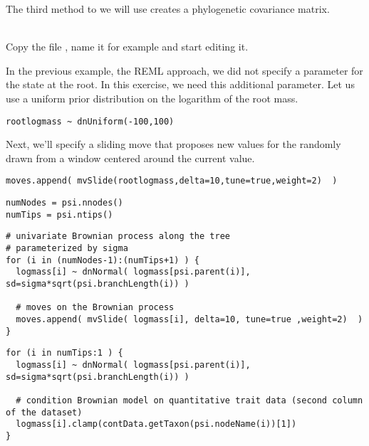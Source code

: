 The third method to we will use creates a phylogenetic covariance matrix. 

\noindent \\ \impmark Copy the file , name it for example  and start editing it.

In the previous example, the REML approach, we did not specify a parameter for the state at the root.
In this exercise, we need this additional parameter.
Let us use a uniform prior distribution on the logarithm of the root mass.
{\tt \small \begin{snugshade*}
\begin{lstlisting}
rootlogmass ~ dnUniform(-100,100)
\end{lstlisting}
\end{snugshade*}}
Next, we'll specify a sliding move that proposes new values for the  randomly drawn from a window centered around the current value.
{\tt \small \begin{snugshade*}
\begin{lstlisting}
moves.append( mvSlide(rootlogmass,delta=10,tune=true,weight=2)  )
\end{lstlisting}
\end{snugshade*}}


{\tt \small \begin{snugshade*}
\begin{lstlisting}
numNodes = psi.nnodes()
numTips = psi.ntips()
\end{lstlisting}
\end{snugshade*}}


{\tt \small \begin{snugshade*}
\begin{lstlisting}
# univariate Brownian process along the tree
# parameterized by sigma
for (i in (numNodes-1):(numTips+1) ) {
  logmass[i] ~ dnNormal( logmass[psi.parent(i)], sd=sigma*sqrt(psi.branchLength(i)) )

  # moves on the Brownian process
  moves.append( mvSlide( logmass[i], delta=10, tune=true ,weight=2)  )
}
\end{lstlisting}
\end{snugshade*}}


{\tt \small \begin{snugshade*}
\begin{lstlisting}
for (i in numTips:1 ) {
  logmass[i] ~ dnNormal( logmass[psi.parent(i)], sd=sigma*sqrt(psi.branchLength(i)) )

  # condition Brownian model on quantitative trait data (second column of the dataset)
  logmass[i].clamp(contData.getTaxon(psi.nodeName(i))[1])
}
\end{lstlisting}
\end{snugshade*}}

